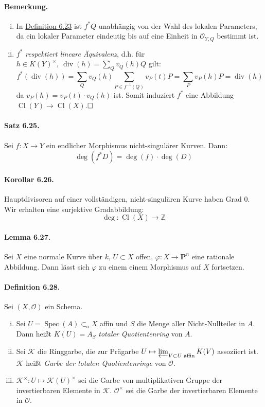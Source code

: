 \documentclass[11pt,b5paper,openany]{memoir}
\def \qed {$\hfill\square$}
\begin{document}
\paragraph{Bemerkung.} \begin{enumerate}[(i)]
\item In \hyperref[6.23]{Definition 6.23} ist $f^\ast Q$ unabhängig von der Wahl des lokalen Parameters, da ein lokaler Parameter eindeutig bis auf eine Einheit in $\mathcal{O}_{Y,Q}$ bestimmt ist.
\item $f^\ast$ \textit{respektiert lineare Äquivalenz}, d.h. für $h\in K(Y)^\times,\ \operatorname{div}(h)=\sum_Qv_Q(h)Q$ gilt:
\[f^\ast(\operatorname{div}(h))=\sum_Qv_Q(h)\sum_{P\in f^{-1}(Q)}v_P(t)P=\sum_Pv_P(h)P=\operatorname{div}(h) \]
da $v_P(h)=v_P(t)\cdot v_Q(h)$ ist. Somit induziert $f^\ast$ eine Abbildung $\operatorname{Cl}(Y)\to\operatorname{Cl}(X)$.\qed
\end{enumerate}

\paragraph{Satz 6.25.}\label{6.25} Sei $f:X\to Y$ ein endlicher Morphismus nicht-singulärer Kurven. Dann:
\[\deg(f^\ast D)=\deg(f)\cdot \deg(D) \]

\paragraph{Korollar 6.26.}\label{6.26} Hauptdivisoren auf einer vollständigen, nicht-singulären Kurve haben Grad $0$. Wir erhalten eine surjektive Gradabbildung:
\[\deg:\operatorname{Cl}(X)\to\mathbb{Z} \]

\paragraph{Lemma 6.27.}\label{6.27} Sei $X$ eine normale Kurve über $k$, $U\subset X$ offen, $\varphi:X\to\mathbf{P}^n$ eine rationale Abbildung. Dann lässt sich $\varphi$ zu einem einem Morphismus auf $X$ fortsetzen.

\paragraph{Definition 6.28.}\label{6.28} Sei $(X,\mathcal{O})$ ein Schema.
\begin{enumerate}[(i)]
\item Sei $U=\operatorname{Spec}(A)\subset_\text{o}X$ affin und $S$ die Menge aller Nicht-Nullteiler in $A$. Dann heißt $K(U)=A_S$ \textit{totaler Quotientenring} von $A$.
\item Sei $\mathcal{K}$ die Ringgarbe, die zur Prägarbe $U\mapsto\varprojlim_{V\subset U\text{ affin}} K(V)$ assoziiert ist. $\mathcal{K}$ heißt \textit{Garbe der totalen Quotientenringe} von $\mathcal{O}$.
\item $\mathcal{K}^\times:U\mapsto \mathcal{K}(U)^\times$ sei die Garbe von multiplikativen Gruppe der invertierbaren Elemente in $\mathcal{K}$. $\mathcal{O}^\times$ sei die Garbe der invertierbaren Elemente in $\mathcal{O}$.
\end{enumerate}
\end{document}
